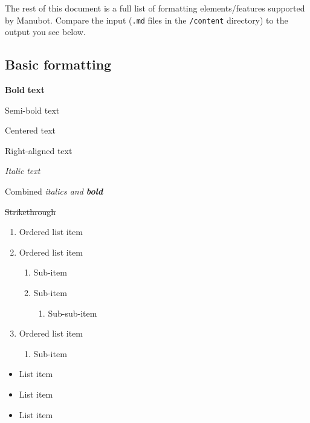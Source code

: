 The rest of this document is a full list of formatting elements/features supported by Manubot.
Compare the input (\texttt{.md} files in the \texttt{/content} directory) to the output you see below.

\hypertarget{basic-formatting}{%
\subsection{Basic formatting}\label{basic-formatting}}

\textbf{Bold} \textbf{text}

{Semi-bold text}

{Centered text}

{Right-aligned text}

\emph{Italic} \emph{text}

Combined \emph{italics and \textbf{bold}}

\sout{Strikethrough}

\begin{enumerate}
\def\labelenumi{\arabic{enumi}.}
\tightlist
\item
  Ordered list item
\item
  Ordered list item

  \begin{enumerate}
  \def\labelenumii{\alph{enumii}.}
  \tightlist
  \item
    Sub-item
  \item
    Sub-item

    \begin{enumerate}
    \def\labelenumiii{\roman{enumiii}.}
    \tightlist
    \item
      Sub-sub-item
    \end{enumerate}
  \end{enumerate}
\item
  Ordered list item

  \begin{enumerate}
  \def\labelenumii{\alph{enumii}.}
  \tightlist
  \item
    Sub-item
  \end{enumerate}
\end{enumerate}

\begin{itemize}
\tightlist
\item
  List item
\item
  List item
\item
  List item
\end{itemize}


